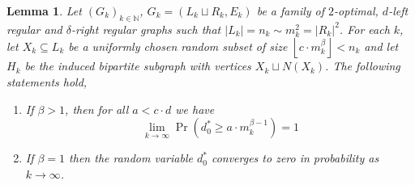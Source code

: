 \documentclass[12pt]{amsart}
\newtheorem{lemma}{Lemma}[section]
\theoremstyle{definition}
\renewcommand{\geq}{\geqslant}
\newcommand{\NN}{\ensuremath{\mathbb{N}}}
\newcommand{\1}{\ensuremath{\mathbb{1}}}
\begin{document}
\begin{lemma}\label{lem: rmin_selection}
Let $(G_k)_{k \in \NN}$, $G_k = (L_k \sqcup R_k,E_k)$ be a family of $2$-optimal, $d$-left regular and $\delta$-right regular graphs such that $|L_k| = n_k \sim m_k^2 = |R_k|^2$. For each $k$, let $X_k \subseteq L_k$ be a uniformly chosen random subset of size $\left\lfloor c\cdot m_k^{\beta}\right \rfloor<n_k$ and let $H_k$ be the induced bipartite subgraph with vertices $X_k\sqcup N(X_k)$. The following statements hold,
\begin{enumerate}
    \item If $\beta>1$, then for all $a < c \cdot d$ we have 
    \[\lim_{k\rightarrow \infty}\Pr\left(d_0^* \geq a \cdot  m_k^{\beta-1}\right) = 1\]

    \item If $\beta = 1$ then the random variable
    $d_0^*$ converges to zero in probability as $k\rightarrow\infty$. 
\end{enumerate}
\end{lemma}
\end{document}
